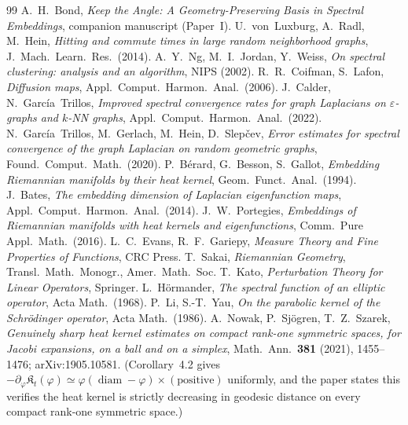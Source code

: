 \documentclass[11pt]{article}
\theoremstyle{remark}
\begin{document}
\begin{thebibliography}{99}
 A.~H.~Bond, \emph{Keep the Angle: A Geometry-Preserving Basis in Spectral Embeddings}, companion manuscript (Paper~I).
 U.~von~Luxburg, A.~Radl, M.~Hein, \emph{Hitting and commute times in large random neighborhood graphs}, J.~Mach.\ Learn.\ Res.\ (2014).
 A.~Y.~Ng, M.~I.~Jordan, Y.~Weiss, \emph{On spectral clustering: analysis and an algorithm}, NIPS (2002).
 R.~R.~Coifman, S.~Lafon, \emph{Diffusion maps}, Appl.\ Comput.\ Harmon.\ Anal.\ (2006).
 J.~Calder, N.~Garc\'ia~Trillos, \emph{Improved spectral convergence rates for graph Laplacians on $\varepsilon$-graphs and $k$-NN graphs}, Appl.\ Comput.\ Harmon.\ Anal.\ (2022).
 N.~Garc\'ia~Trillos, M.~Gerlach, M.~Hein, D.~Slep\v{c}ev, \emph{Error estimates for spectral convergence of the graph Laplacian on random geometric graphs}, Found.\ Comput.\ Math.\ (2020).
 P.~B\'erard, G.~Besson, S.~Gallot, \emph{Embedding Riemannian manifolds by their heat kernel}, Geom.\ Funct.\ Anal.\ (1994).
 J.~Bates, \emph{The embedding dimension of Laplacian eigenfunction maps}, Appl.\ Comput.\ Harmon.\ Anal.\ (2014).
 J.~W.~Portegies, \emph{Embeddings of Riemannian manifolds with heat kernels and eigenfunctions}, Comm.\ Pure Appl.\ Math.\ (2016).
 L.~C.~Evans, R.~F.~Gariepy, \emph{Measure Theory and Fine Properties of Functions}, CRC Press.
 T.~Sakai, \emph{Riemannian Geometry}, Transl.\ Math.\ Monogr., Amer.\ Math.\ Soc.
 T.~Kato, \emph{Perturbation Theory for Linear Operators}, Springer.
 L.~H\"ormander, \emph{The spectral function of an elliptic operator}, Acta Math.\ (1968).
 P.~Li, S.-T.~Yau, \emph{On the parabolic kernel of the Schr\"odinger operator}, Acta Math.\ (1986).
 A.~Nowak, P.~Sj\"ogren, T.~Z.~Szarek, \emph{Genuinely sharp heat kernel estimates on compact rank-one symmetric spaces, for Jacobi expansions, on a ball and on a simplex}, Math.\ Ann.\ \textbf{381} (2021), 1455--1476; arXiv:1905.10581. (Corollary~4.2 gives $-\partial_\varphi\mathfrak K_t(\varphi)\simeq\varphi(\operatorname{diam}-\varphi)\times(\text{positive})$ uniformly, and the paper states this verifies the heat kernel is strictly decreasing in geodesic distance on every compact rank-one symmetric space.)

\end{thebibliography}
\end{document}
